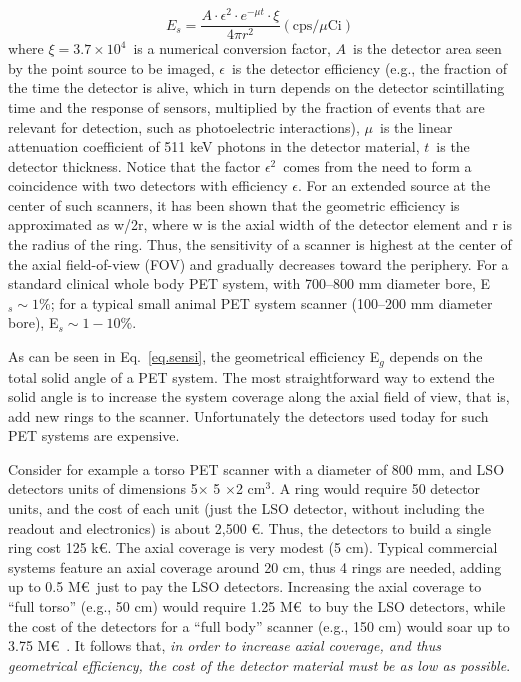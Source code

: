 \documentclass[review]{elsarticle}
\begin{document}
\begin{equation}
E_s = \frac{A \cdot \epsilon^2 \cdot e^{-\mu t} \cdot \xi}{4 \pi r^2} (\mathrm{cps}/\mu \mathrm{Ci})
\label{eq.sensi}
\end{equation}
%
where $\xi = 3.7 \times 10^4$~is a numerical conversion factor, $A$~is the detector area seen by the point source to be imaged, $\epsilon$~is the detector efficiency (e.g., the fraction of the time the detector is alive, which in turn depends on the detector scintillating time and the response of sensors, multiplied by the fraction of events that are relevant for detection, such as photoelectric interactions), $\mu$~is the linear attenuation coefficient of 511 keV photons in the detector material, $t$~is the detector thickness. Notice that the factor $\epsilon^2$~comes from the need to form a coincidence with two detectors with efficiency $\epsilon$. For an extended source at the center of such scanners, it has been shown that the geometric efficiency is approximated as w/2r, where w is the axial width of the detector element and r is the radius of the ring. Thus, the sensitivity of a scanner is highest at the center of the axial field-of-view (FOV) and gradually decreases toward the periphery.
For a standard clinical whole body PET
system, with 700--800 mm diameter bore, E$_s \sim 1$\%; for a typical
small animal PET system scanner (100--200 mm diameter bore), E$_s \sim 1-10$\%.

As can be seen in Eq.~\ref{eq.sensi}, the geometrical efficiency E$_g$ depends on the total solid angle of a PET system.  The most straightforward way to extend the solid angle is to increase the system
coverage along the axial field of view, that is, add new rings to the scanner. Unfortunately the detectors used today for such PET systems are expensive.

Consider for example a torso PET scanner with a diameter of 800 mm, and LSO detectors units of dimensions 5$\times$ 5 $\times $2 cm$^3$. A ring would require 50 detector units, and the cost of each unit (just the LSO detector, without including the readout and electronics) is about 2,500 \euro. Thus, the detectors to build a single ring cost 125 k\euro. The axial coverage is very modest (5 cm). Typical commercial systems feature an axial coverage around 20 cm, thus 4 rings are needed,  adding up to 0.5 M\euro\ just to pay the LSO detectors. Increasing the axial coverage to ``full torso'' (e.g., 50 cm) would require 1.25 M\euro\ to buy the LSO detectors, while the cost of the detectors for a ``full body'' scanner (e.g., 150 cm) would soar up to 3.75 M\euro\ . It follows that, {\em in order to increase axial coverage, and thus geometrical efficiency, the cost of the detector material must be as low as possible}.
\end{document}
